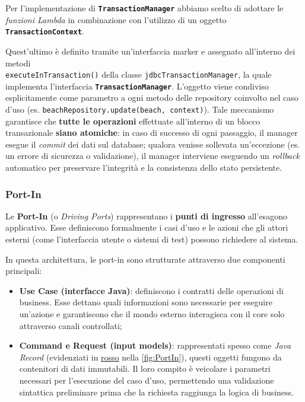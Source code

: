 \documentclass[a4paper,11pt]{article}
\begin{document}
Per l'implementazione di \textbf{\texttt{TransactionManager}} abbiamo scelto di adottare le \textit{funzioni Lambda} in combinazione con l'utilizzo di un oggetto \textbf{\texttt{TransactionContext}}. 

Quest'ultimo è definito tramite un'interfaccia marker e assegnato all'interno dei metodi \\ \texttt{executeInTransaction()} della classe \texttt{jdbcTransactionManager}, la quale implementa  l'interfaccia \textbf{\texttt{TransactionManager}}. L'oggetto viene condiviso esplicitamente come parametro a ogni metodo delle repository coinvolto nel caso d'uso (es. \texttt{beachRepository.update(beach, context)}). Tale meccanismo garantisce che \textbf{tutte le operazioni} effettuate all'interno di un blocco transazionale \textbf{siano atomiche}: in caso di successo di ogni passaggio, il manager esegue il \textit{commit} dei dati sul database; qualora venisse sollevata un'eccezione (es. un errore di sicurezza o validazione), il manager interviene eseguendo un \textit{rollback} automatico per preservare l'integrità e la consistenza dello stato persistente.


\subsubsection{Port-In}

Le \textbf{Port-In} (o \textit{Driving Ports}) rappresentano i \textbf{punti di ingresso} all'esagono applicativo. Esse definiscono formalmente i casi d'uso e le azioni che gli attori esterni (come l'interfaccia utente o sistemi di test) possono richiedere al sistema. 

In questa architettura, le port-in sono strutturate attraverso due componenti principali:

\begin{itemize}
    \item \textbf{Use Case (interfacce Java)}: definiscono i contratti delle operazioni di business. Esse dettano quali informazioni sono necessarie per eseguire un'azione e garantiscono che il mondo esterno interagisca con il core solo attraverso canali controllati;
    \item \textbf{Command e Request (input models)}: rappresentati spesso come \textit{Java Record} (evidenziati in \underline{rosso} nella \autoref{fig:PortIn}), questi oggetti fungono da contenitori di dati immutabili. Il loro compito è veicolare i parametri necessari per l'esecuzione del caso d'uso, permettendo una validazione sintattica preliminare prima che la richiesta raggiunga la logica di business.
\end{itemize}
\end{document}
